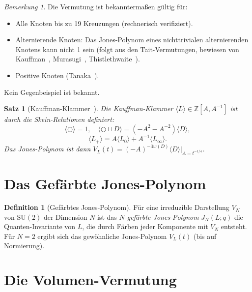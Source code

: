 \documentclass[12pt,a4paper]{amsart}
\newtheorem{satz}[theorem]{Satz}
\theoremstyle{definition}
\newtheorem{definition_de}[theorem]{Definition}
\theoremstyle{remark}
\newtheorem{bemerkung}[theorem]{Bemerkung}
\newcommand{\Z}{\mathbb{Z}}
\begin{document}
\begin{bemerkung}
Die Vermutung ist bekanntermaßen gültig für:
\begin{itemize}
\item Alle Knoten bis zu 19 Kreuzungen (rechnerisch verifiziert).
\item Alternierende Knoten: Das Jones-Polynom eines nichttrivialen
      alternierenden Knotens kann nicht 1 sein (folgt aus den Tait-Vermutungen,
      bewiesen von Kauffman~\cite{Kauffman1987}, Murasugi~\cite{Murasugi1987},
      Thistlethwaite~\cite{Thistlethwaite1987}).
\item Positive Knoten (Tanaka~\cite{Tanaka1996}).
\end{itemize}
Kein Gegenbeispiel ist bekannt.
\end{bemerkung}

\begin{satz}[Kauffman-Klammer~\cite{Kauffman1987}]
Die \emph{Kauffman-Klammer} $\langle L \rangle \in \Z[A, A^{-1}]$ ist durch
die Skein-Relationen definiert:
\[
    \langle \bigcirc \rangle = 1, \quad
    \langle \bigcirc \sqcup D \rangle = (-A^2 - A^{-2})\langle D \rangle,
\]
\[
    \langle L_+ \rangle = A \langle L_0 \rangle + A^{-1} \langle L_\infty \rangle.
\]
Das Jones-Polynom ist dann
$V_L(t) = (-A)^{-3w(D)} \langle D \rangle \big|_{A = t^{-1/4}}$.
\end{satz}

\section{Das Gefärbte Jones-Polynom}

\begin{definition_de}[Gefärbtes Jones-Polynom]
Für eine irreduzible Darstellung $V_N$ von $\mathrm{SU}(2)$ der Dimension $N$
ist das \emph{$N$-gefärbte Jones-Polynom} $J_N(L; q)$ die Quanten-Invariante
von $L$, die durch Färben jeder Komponente mit $V_N$ entsteht.
Für $N=2$ ergibt sich das gewöhnliche Jones-Polynom $V_L(t)$ (bis auf
Normierung).
\end{definition_de}

\section{Die Volumen-Vermutung}
\end{document}
